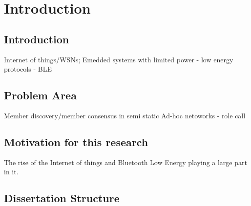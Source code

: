 \chapter{Introduction}

	\section{Introduction}
		Internet of things/WSNs; Emedded systems with limited power - low energy protocols
		- BLE \cite{greenwade93}
	\section{Problem Area}
		Member discovery/member consensus in semi static Ad-hoc netoworks - role call
	\section{Motivation for this research}
		The rise of the Internet of things and Bluetooth Low Energy playing a large
		part in it.
	\section{Dissertation Structure}
